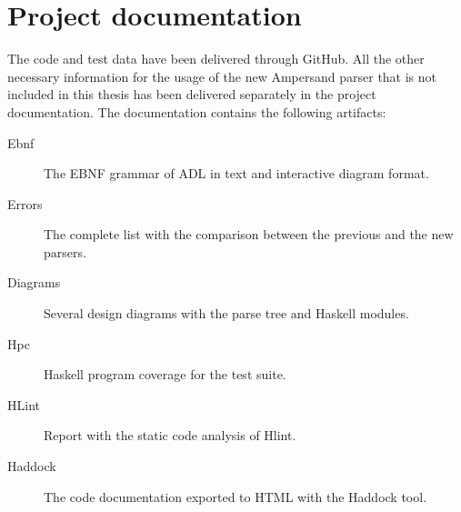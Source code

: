 
\section*{Project documentation}
\label{app:docs}
The code and test data have been delivered through GitHub.
All the other necessary information for the usage of the new Ampersand parser that is not included in this thesis has been delivered separately in the project documentation.
The documentation contains the following artifacts:
\begin{description}
  \item [Ebnf] The EBNF grammar of ADL in text and interactive diagram format.
  \item [Errors] The complete list with the comparison between the previous and the new parsers.
  \item [Diagrams] Several design diagrams with the parse tree and Haskell modules.
  \item [Hpc] Haskell program coverage for the test suite.
  \item [HLint] Report with the static code analysis of Hlint.
  \item [Haddock] The code documentation exported to HTML with the Haddock tool.
\end{description}
